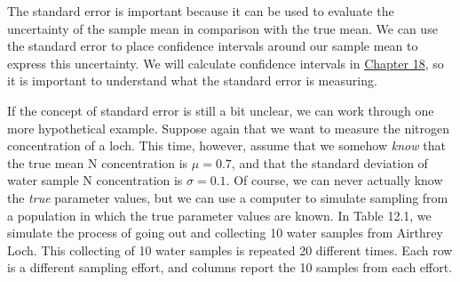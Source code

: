 \documentclass[
  openany]{krantz}
\begin{document}
The standard error is important because it can be used to evaluate the uncertainty of the sample mean in comparison with the true mean.
We can use the standard error to place confidence intervals around our sample mean to express this uncertainty.
We will calculate confidence intervals in \protect\hyperlink{Chapter_18}{Chapter 18}, so it is important to understand what the standard error is measuring.

If the concept of standard error is still a bit unclear, we can work through one more hypothetical example.
Suppose again that we want to measure the nitrogen concentration of a loch.
This time, however, assume that we somehow \emph{know} that the true mean N concentration is \(\mu = 0.7\), and that the standard deviation of water sample N concentration is \(\sigma = 0.1\).
Of course, we can never actually know the \emph{true} parameter values, but we can use a computer to simulate sampling from a population in which the true parameter values are known.
In Table 12.1, we simulate the process of going out and collecting 10 water samples from Airthrey Loch.
This collecting of 10 water samples is repeated 20 different times.
Each row is a different sampling effort, and columns report the 10 samples from each effort.
\end{document}
